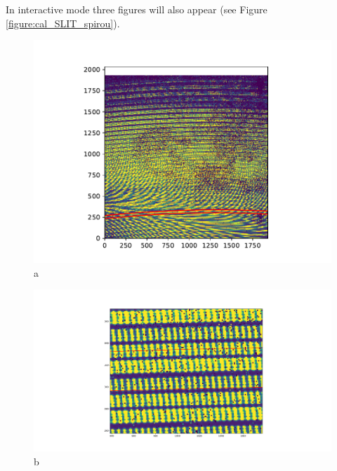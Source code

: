 \noindent In interactive mode three figures will also appear (see Figure \ref{figure:cal_SLIT_spirou}).

\begin{figure}

\begin{center}
\begin{minipage}{.495\textwidth}
\begin{center}
\includegraphics[width=\textwidth]{Figures/cal_SLIT_spirou_1a.pdf}
a
\end{center}
\end{minipage}%
\begin{minipage}{.495\textwidth}
\begin{center}
\includegraphics[width=\textwidth]{Figures/cal_SLIT_spirou_1b.pdf}
b
\end{center}
\end{minipage}%
\end{center}


\end{figure}
